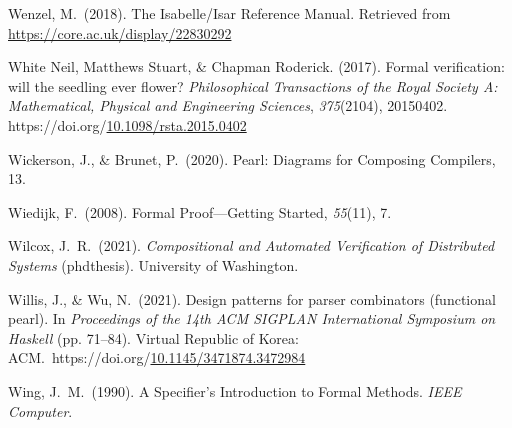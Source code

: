 \documentclass[12pt,twoside]{article}
\begin{document}
{\begin{thebibliography}{1079}
\mdbibitemlabel{}Wenzel, M.~(2018). The Isabelle/Isar Reference Manual. Retrieved from \href{https://core.ac.uk/display/22830292}{{\ttfamily https://\hspace{0pt}core.\hspace{0pt}ac.\hspace{0pt}uk/\hspace{0pt}display/\hspace{0pt}22830292}}%

\mdbibitemlabel{}White Neil, Matthews Stuart, \& Chapman Roderick. (2017). Formal verification: will the seedling ever flower? \emph{Philosophical Transactions of the Royal Society A: Mathematical, Physical and Engineering Sciences}, \emph{375}(2104), 20150402. https://doi.org/\href{https://dx.doi.org/10.1098/rsta.2015.0402}{10.1098/rsta.2015.0402}%

\mdbibitemlabel{}Wickerson, J., \& Brunet, P.~(2020). Pearl: Diagrams for Composing Compilers, 13.%

\mdbibitemlabel{}Wiedijk, F.~(2008). Formal Proof—Getting Started, \emph{55}(11), 7.%

\mdbibitemlabel{}Wilcox, J.~R.~(2021). \emph{Compositional and Automated Veriﬁcation of Distributed Systems} (phdthesis). University of Washington.%

\mdbibitemlabel{}Willis, J., \& Wu, N.~(2021). Design patterns for parser combinators (functional pearl). In \emph{Proceedings of the 14th ACM SIGPLAN International Symposium on Haskell} (pp. 71–84). Virtual Republic of Korea: ACM.~https://doi.org/\href{https://dx.doi.org/10.1145/3471874.3472984}{10.1145/3471874.3472984}%

\mdbibitemlabel{}Wing, J.~M.~(1990). A Specifier’s Introduction to Formal Methods. \emph{IEEE Computer}.%


\end{thebibliography}}
\end{document}
